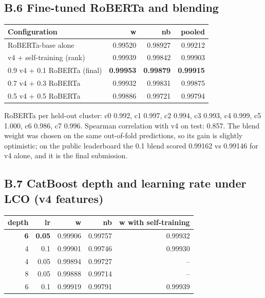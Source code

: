 \documentclass[11pt,letterpaper]{article}
\newcommand{\smallnote}[1]{{\small\color{muted}#1}}
\begin{document}
\subsection*{B.6 Fine-tuned RoBERTa and blending}
\begin{tabularx}{\linewidth}{@{}Yrrr@{}}\toprule Configuration & w & nb & pooled \\ \midrule
RoBERTa-base alone & 0.99520 & 0.98927 & 0.99212 \\
v4 + self-training (rank) & 0.99939 & 0.99842 & 0.99903 \\
0.9 v4 + 0.1 RoBERTa (final) & \textbf{0.99953} & \textbf{0.99879} & \textbf{0.99915} \\
0.7 v4 + 0.3 RoBERTa & 0.99932 & 0.99831 & 0.99875 \\
0.5 v4 + 0.5 RoBERTa & 0.99886 & 0.99721 & 0.99794 \\
\bottomrule\end{tabularx}
\smallnote{RoBERTa per held-out cluster: c0 0.992, c1 0.997, c2 0.994, c3 0.993, c4 0.999, c5 1.000, c6 0.986, c7 0.996. Spearman correlation with v4 on test: 0.857. The blend weight was chosen on the same out-of-fold predictions, so its gain is slightly optimistic; on the public leaderboard the 0.1 blend scored 0.99162 vs 0.99146 for v4 alone, and it is the final submission.}

\subsection*{B.7 CatBoost depth and learning rate under LCO (v4 features)}
\begin{tabularx}{\linewidth}{@{}rrrrr@{}}\toprule depth & lr & w & nb & w with self-training \\ \midrule
\textbf{6} & \textbf{0.05} & 0.99906 & 0.99757 & 0.99932 \\
4 & 0.1 & 0.99901 & 0.99746 & 0.99930 \\
4 & 0.05 & 0.99894 & 0.99727 & -- \\
8 & 0.05 & 0.99888 & 0.99714 & -- \\
6 & 0.1 & 0.99919 & 0.99791 & 0.99939 \\
\bottomrule\end{tabularx}
\end{document}
